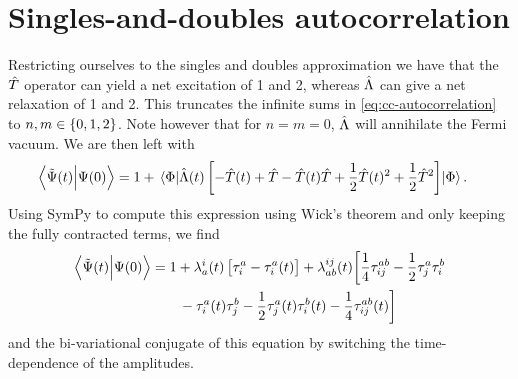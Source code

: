     \section{Singles-and-doubles autocorrelation}
        Restricting ourselves to the singles and doubles approximation we have
        that the $\hat{T}$ operator can yield a net excitation of 1 and 2,
        whereas $\hat{\Lambda}$ can give a net relaxation of 1 and 2.
        This truncates the infinite sums in \autoref{eq:cc-autocorrelation} to
        $n, m \in \left\{ 0, 1, 2 \right\}$.
        Note however that for $n = m = 0$, $\hat{\Lambda}$ will annihilate the Fermi
        vacuum.
        We are then left with
        \begin{align}
            \braket{\tilde{\Psi}(t)}{\Psi(0)}
            &= 1
            + \mel{\Phi}{
                \hat{\Lambda}(t)\left[ 
                    - \hat{T}(t) + \hat{T}- \hat{T}(t)\hat{T}+ \frac{1}{2}\hat{T}(t)^2 + \frac{1}{2}\hat{T}^2
                 \right]
            }{\Phi}.
        \end{align}
        Using SymPy \cite{sympy} to compute this expression using Wick's theorem
        and only keeping the fully contracted terms, we find
        \begin{align}
            \braket{\tilde{\Psi}(t)}{\Psi(0)}
            &=
            1
            + \lambda^{i}_{a}(t) \left[ 
                \tau^{a}_{i} - \tau^{a}_{i}(t)
             \right]
            + \lambda^{ij}_{ab}(t) \biggl[
                \frac{1}{4}\tau^{ab}_{ij}
                - \frac{1}{2} \tau^{a}_{j} \tau^{b}_{i}
                \nonumber \\
                &\qquad
                - \tau^{a}_{i}(t) \tau^{b}_{j}
                - \frac{1}{2} \tau^{a}_{j}(t) \tau^{b}_{i}(t)
                - \frac{1}{4} \tau^{ab}_{ij}(t)
            \biggr]
        \end{align}
        and the bi-variational conjugate of this equation by switching the
        time-dependence of the amplitudes.
